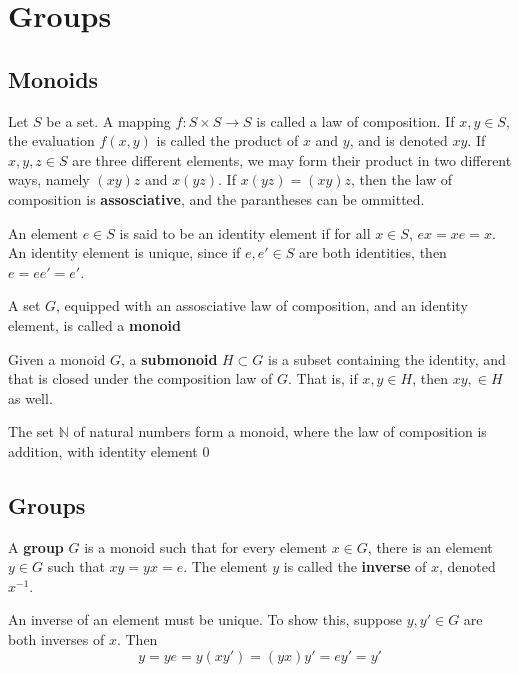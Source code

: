 \chapter{Groups}

\section{Monoids}

Let $S$ be a set. A mapping $f: S \times S \to S$ is called a law of composition. If $x, y \in S$, the evaluation $f(x, y)$ is called the product of $x$ and $y$, and is denoted $xy$.
If $x, y, z \in S$ are three different elements, we may form their product in two different ways, namely $(xy)z$ and $x(yz)$. If $x(yz) = (xy)z$, then the law of composition is 
\textbf{assosciative}, and the parantheses can be ommitted. 

An element $e \in S$ is said to be an identity element if for all $x \in S$, $ex = xe = x$. An identity element is unique, since if $e, e' \in S$ are both identities, then
$e = ee' = e'$.

\begin{definition} A set $G$, equipped with an assosciative law of composition, and an identity element, is called a \textbf{monoid} \end{definition}
\begin{definition} Given a monoid $G$, a \textbf{submonoid} $H \subset G$ is a subset containing the identity, and that is closed under the composition law of $G$. That is,
    if $x, y \in H$, then $xy, \in H$ as well.
\end{definition}

\begin{exmp}
    The set $\mathbb{N}$ of natural numbers form a monoid, where the law of composition is addition, with identity element $0$
\end{exmp}

\section{Groups}

\begin{definition} A \textbf{group} $G$ is a monoid such that for every element $x \in G$, there is an element $y \in G$ such that $xy = yx = e$. The element $y$ is called the 
    \textbf{inverse} of $x$, denoted $x^{-1}$. 
\end{definition}

An inverse of an element must be unique. To show this, suppose $y, y' \in G$ are both inverses of $x$. Then 
\[ y = ye = y(xy') = (yx)y' = ey' = y'\]

